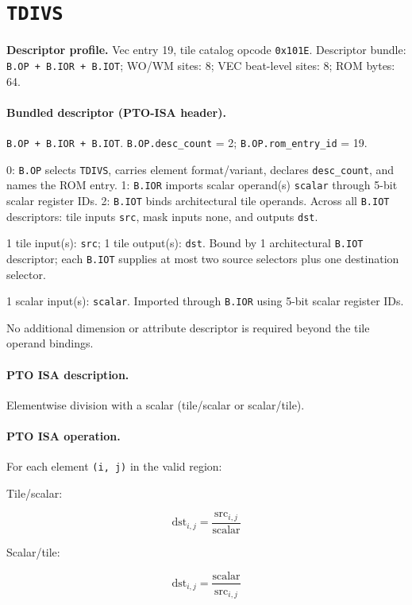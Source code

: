 \section{\texttt{TDIVS}}
\noindent\textbf{Descriptor profile.} Vec entry 19, tile catalog opcode \texttt{0x101E}. Descriptor bundle: \texttt{B.OP + B.IOR + B.IOT}; WO/WM sites: 8; VEC beat-level sites: 8; ROM bytes: 64.\par\smallskip
{}
\paragraph{Bundled descriptor (PTO-ISA header).}
\begin{description}[leftmargin=0.18\linewidth,style=nextline]
\item[Bundle] \texttt{B.OP + B.IOR + B.IOT}. \texttt{B.OP.desc\_count} = 2; \texttt{B.OP.rom\_entry\_id} = 19.
\item[Assembly] 0: \texttt{B.OP} selects \texttt{TDIVS}, carries element format/variant, declares \texttt{desc\_count}, and names the ROM entry. 1: \texttt{B.IOR} imports scalar operand(s) \texttt{scalar} through 5-bit scalar register IDs. 2: \texttt{B.IOT} binds architectural tile operands. Across all \texttt{B.IOT} descriptors: tile inputs \texttt{src}, mask inputs none, and outputs \texttt{dst}.
\item[Tile operands] 1 tile input(s): \texttt{src}; 1 tile output(s): \texttt{dst}. Bound by 1 architectural \texttt{B.IOT} descriptor; each \texttt{B.IOT} supplies at most two source selectors plus one destination selector.
\item[Scalar GPR operands] 1 scalar input(s): \texttt{scalar}. Imported through \texttt{B.IOR} using 5-bit scalar register IDs.
\item[Metadata operands] No additional dimension or attribute descriptor is required beyond the tile operand bindings.
\end{description}
\par\smallskip
{\small
\paragraph{PTO ISA description.}
Elementwise division with a scalar (tile/scalar or scalar/tile).
\paragraph{PTO ISA operation.}
For each element \texttt{(i, j)} in the valid region:

\noindent{}Tile/scalar:

\[
\mathrm{dst}_{i,j} = \frac{\mathrm{src}_{i,j}}{\mathrm{scalar}}
\]

\noindent{}Scalar/tile:

\[
\mathrm{dst}_{i,j} = \frac{\mathrm{scalar}}{\mathrm{src}_{i,j}}
\]
}\par\smallskip
